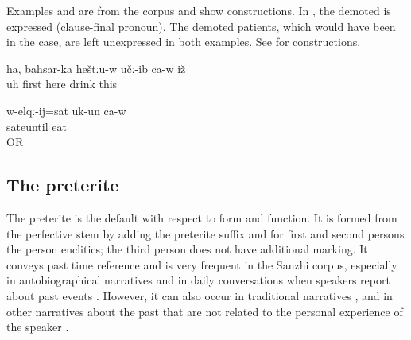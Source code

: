 Examples  and  are from the corpus and show  constructions. In , the demoted  is expressed (clause-final pronoun). The demoted patients, which would have been in the  case, are left unexpressed in both examples. See  for  constructions.

\begin{exe}
	\ex	\label{ex:Uh, first he drank here analytic}
	\gll	ha,	bahsar-ka	heštːu-w	učː-ib	ca-w	iž\\
		uh	first	here	 drink		this\\
	\glt	{}

	\ex	\label{ex:He ate until he was full analytic}
	\gll	w-elqː-ij=sat	uk-un	ca-w\\
		sateuntil	eat	\\
	\glt	{} OR 
\end{exe}



\subsection{The preterite}
\label{ssec:The preterite}

The preterite is the default  with respect to form and function. It is formed from the perfective stem by adding the preterite suffix and for first and second persons the person enclitics; the third person does not have additional marking. It conveys past time reference and is very frequent in the Sanzhi corpus, especially in autobiographical narratives  and in daily conversations when speakers report about past events . However, it can also occur in traditional narratives ,  and in other narratives about the past that are not related to the personal experience of the speaker .


